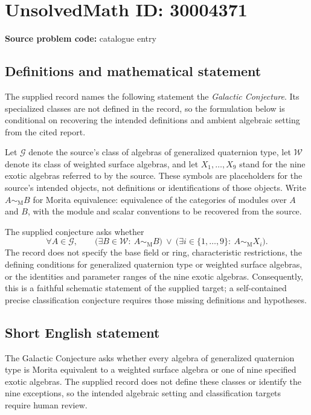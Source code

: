 \documentclass[11pt]{article}
\begin{document}
\section*{UnsolvedMath ID: 30004371}
\textbf{Source problem code:} catalogue entry
\subsection{Definitions and mathematical statement}
The supplied record names the following statement the \emph{Galactic Conjecture}. Its specialized classes are not defined in the record, so the formulation below is conditional on recovering the intended definitions and ambient algebraic setting from the cited report.

Let \(\mathcal G\) denote the source's class of algebras of generalized quaternion type, let \(\mathcal W\) denote its class of weighted surface algebras, and let \(X_1,\ldots,X_9\) stand for the nine exotic algebras referred to by the source. These symbols are placeholders for the source's intended objects, not definitions or identifications of those objects. Write \(A\sim_{\mathrm M}B\) for Morita equivalence: equivalence of the categories of modules over \(A\) and \(B\), with the module and scalar conventions to be recovered from the source.

The supplied conjecture asks whether
\[
\forall A\in\mathcal G,\qquad
\bigl(\exists B\in\mathcal W:\ A\sim_{\mathrm M}B\bigr)
\ \lor\
\bigl(\exists i\in\{1,\ldots,9\}:\ A\sim_{\mathrm M}X_i\bigr).
\]
The record does not specify the base field or ring, characteristic restrictions, the defining conditions for generalized quaternion type or weighted surface algebras, or the identities and parameter ranges of the nine exotic algebras. Consequently, this is a faithful schematic statement of the supplied target; a self-contained precise classification conjecture requires those missing definitions and hypotheses.
\subsection{Short English statement}
The Galactic Conjecture asks whether every algebra of generalized quaternion type is Morita equivalent to a weighted surface algebra or one of nine specified exotic algebras. The supplied record does not define these classes or identify the nine exceptions, so the intended algebraic setting and classification targets require human review.
\end{document}
